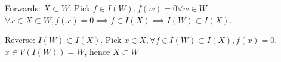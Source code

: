 \documentclass[12pt]{article}
\newcommand{\E}{\mathbb{E}}
\newcommand{\argmax}{\operatornamewithlimits{argmax}}
\begin{document}
Forwards: $X\subset W$.  Pick $f\in I(W), f(w)=0 \forall w\in W$.  $\forall x\in X\subset W, f(x)=0 \implies f\in I(X) \implies I(W)\subset I(X)$.

Reverse: $I(W)\subset I(X)$.  Pick $x\in X, \forall f\in I(W)\subset I(X), f(x)=0$.  $x\in V(I(W))=W$, hence $X\subset W$







 
%
%
%

% 
% 
\end{document}
